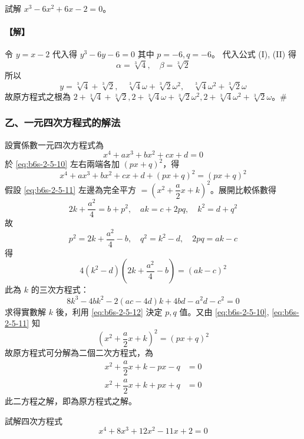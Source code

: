 \begin{example}\label{ex:b6s-2-24}
試解 $x^3-6x^2+6x-2=0$。
\end{example}

\paragraph{【解】}
令 $y=x-2$ 代入得 $y^3-6y-6=0$ 其中 $p=-6, q=-6$。
代入公式 (I), (II) 得
\[ \alpha = \sqrt[3]{4}, \quad \beta = \sqrt[3]{2} \]
所以
\[ y = \sqrt[3]{4}+\sqrt[3]{2}, \quad \sqrt[3]{4}\omega+\sqrt[3]{2}\omega^2, \quad \sqrt[3]{4}\omega^2+\sqrt[3]{2}\omega \]
故原方程式之根為 $2+\sqrt[3]{4}+\sqrt[3]{2}, 2+\sqrt[3]{4}\omega+\sqrt[3]{2}\omega^2, 2+\sqrt[3]{4}\omega^2+\sqrt[3]{2}\omega$。\hfill$\#$

\subsubsection*{乙、一元四次方程式的解法}\label{subsec:b6s-2-5-b}

設實係數一元四次方程式為
\begin{equation}
x^4 + ax^3 + bx^2 + cx + d = 0 \label{eq:b6s-2-5-10}
\end{equation}
於 \eqref{eq:b6s-2-5-10} 左右兩端各加 $(px+q)^2$，得
\begin{equation}
x^4 + ax^3 + bx^2 + cx + d + (px+q)^2 = (px+q)^2 \label{eq:b6s-2-5-11}
\end{equation}
假設 \eqref{eq:b6s-2-5-11} 左邊為完全平方 $= \left(x^2 + \dfrac{a}{2}x + k\right)^2$。展開比較係數得
\begin{equation}
2k + \dfrac{a^2}{4} = b + p^2, \quad ak = c + 2pq, \quad k^2 = d + q^2 \label{eq:b6s-2-5-12}
\end{equation}
故
\[ p^2 = 2k + \dfrac{a^2}{4} - b, \quad q^2 = k^2 - d, \quad 2pq = ak - c \]
得
\[ 4(k^2-d)\left(2k+\dfrac{a^2}{4}-b\right) = (ak-c)^2 \]
此為 $k$ 的三次方程式：
\[ 8k^3 - 4bk^2 - 2(ac-4d)k + 4bd - a^2d - c^2 = 0 \]
求得實數解 $k$ 後，利用 \eqref{eq:b6s-2-5-12} 決定 $p, q$ 值。又由 \eqref{eq:b6s-2-5-10}, \eqref{eq:b6s-2-5-11} 知
\[ \left(x^2 + \dfrac{a}{2}x + k\right)^2 = (px+q)^2 \]
故原方程式可分解為二個二次方程式，為
\begin{align*}
x^2 + \dfrac{a}{2}x + k - px - q &= 0 \\
x^2 + \dfrac{a}{2}x + k + px + q &= 0
\end{align*}
此二方程之解，即為原方程式之解。

\begin{example}\label{ex:b6s-2-25}
試解四次方程式
\[ x^4 + 8x^3 + 12x^2 - 11x + 2 = 0 \]
\end{example}

